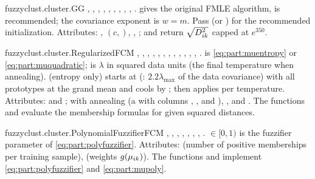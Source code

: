 \begin{apibox}{fuzzyclust.cluster.GG}
, , , , , , , , , .  gives the original FMLE algorithm,  is recommended; the covariance exponent is $w=m$. Pass  (or ) for the recommended initialization. Attributes: ,  $(c,)$, , ;  and  return $\sqrt{D^2_{ik}}$ capped at $e^{350}$.
\end{apibox}

\begin{apibox}{fuzzyclust.cluster.RegularizedFCM}
, , , , , , , , , , , , .  is  \eqref{eq:part:muentropy} or  \eqref{eq:part:muquadratic};  is $\lambda$ in squared data units (the final temperature when annealing).  (entropy only) starts at  (: $2.2\lambda_{\max}$ of the data covariance) with all prototypes at the grand mean and cools by ;  then applies per temperature. Attributes:  and ; with annealing  (a  with columns , , and ), , and . The functions  and  evaluate the membership formulas for given squared distances.
\end{apibox}

\begin{apibox}{fuzzyclust.cluster.PolynomialFuzzifierFCM}
, , , , , , , . $\in[0,1)$ is the fuzzifier parameter of \eqref{eq:part:polyfuzzifier}. Attributes:  (number of positive memberships per training sample),  (weights $g(\mu_{ik})$). The functions  and  implement \eqref{eq:part:polyfuzzifier} and \eqref{eq:part:mupoly}.
\end{apibox}

